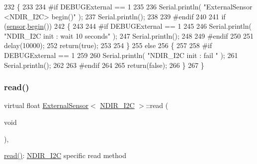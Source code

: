 \begin{DoxyCode}
232     \{
233     
234 \textcolor{preprocessor}{    #if DEBUGExternal == 1 }
235 
236         Serial.println( \textcolor{stringliteral}{"ExternalSensor <NDIR\_I2C> begin()"} );
237         Serial.println();
238     
239 \textcolor{preprocessor}{    #endif }
240 
241         \textcolor{keywordflow}{if} (\hyperlink{class_external_sensor_3_01_n_d_i_r___i2_c_01_4_ae541c9cece7c38674b70114cdb74a7dc}{sensor}.\hyperlink{class_n_d_i_r___i2_c_acf82f3dcb41e75709a93f8b68d087a3c}{begin}()) 
242         \{
243         
244 \textcolor{preprocessor}{        #if DEBUGExternal == 1 }
245             
246             Serial.println( \textcolor{stringliteral}{"NDIR\_I2C init : wait 10 seconds"} );
247             Serial.println();
248         
249 \textcolor{preprocessor}{        #endif}
250 
251             delay(10000);
252             \textcolor{keywordflow}{return}(\textcolor{keyword}{true});
253 
254             \}
255         \textcolor{keywordflow}{else} 
256         \{
257         
258 \textcolor{preprocessor}{        #if DEBUGExternal == 1 }
259 
260             Serial.println( \textcolor{stringliteral}{"NDIR\_I2C init : fail "} );
261             Serial.println();
262         
263 \textcolor{preprocessor}{        #endif}
264 
265             \textcolor{keywordflow}{return}(\textcolor{keyword}{false});
266         \}   
267     \}
\end{DoxyCode}
\mbox{\label{class_external_sensor_3_01_n_d_i_r___i2_c_01_4_a239d18652e9fb4673842ae9726edf44f}} 
\subsubsection{\texorpdfstring{read()}{read()}}
{\footnotesize\ttfamily virtual float \hyperlink{class_external_sensor}{External\+Sensor}$<$ \hyperlink{class_n_d_i_r___i2_c}{N\+D\+I\+R\+\_\+\+I2C} $>$\+::read (\begin{DoxyParamCaption}\item[{void}]{ }\end{DoxyParamCaption})\hspace{0.3cm}{\ttfamily [inline]}, {\ttfamily [virtual]}}

\hyperlink{class_external_sensor_3_01_n_d_i_r___i2_c_01_4_a239d18652e9fb4673842ae9726edf44f}{read()}\+: \hyperlink{class_n_d_i_r___i2_c}{N\+D\+I\+R\+\_\+\+I2C} specific read method

